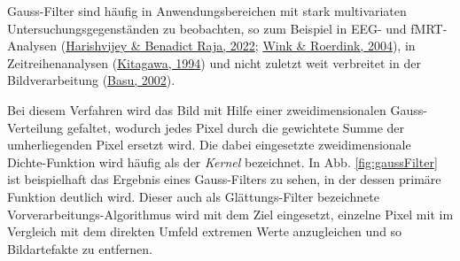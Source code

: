 \documentclass[
  12pt,
]{book}
\begin{document}
Gauss-Filter sind häufig in Anwendungsbereichen mit stark multivariaten Untersuchungsgegenständen zu beobachten, so zum Beispiel in EEG- und fMRT-Analysen (\protect\hyperlink{ref-harishvijeyAutomatedTechniqueEEG2022}{Harishvijey \& Benadict Raja, 2022}; \protect\hyperlink{ref-winkDenoisingFunctionalMR2004}{Wink \& Roerdink, 2004}), in Zeitreihenanalysen (\protect\hyperlink{ref-kitagawaTwofilterFormulaSmoothing1994}{Kitagawa, 1994}) und nicht zuletzt weit verbreitet in der Bildverarbeitung (\protect\hyperlink{ref-basuGaussianbasedEdgedetectionMethodsa2002}{Basu, 2002}).

Bei diesem Verfahren wird das Bild mit Hilfe einer zweidimensionalen Gauss-Verteilung gefaltet, wodurch jedes Pixel durch die gewichtete Summe der umherliegenden Pixel ersetzt wird. Die dabei eingesetzte zweidimensionale Dichte-Funktion wird häufig als der \emph{Kernel} bezeichnet. In Abb. \ref{fig:gaussFilter} ist beispielhaft das Ergebnis eines Gauss-Filters zu sehen, in der dessen primäre Funktion deutlich wird.
Dieser auch als Glättungs-Filter bezeichnete Vorverarbeitungs-Algorithmus wird mit dem Ziel eingesetzt, einzelne Pixel mit im Vergleich mit dem direkten Umfeld extremen Werte anzugleichen und so Bildartefakte zu entfernen.
\end{document}
